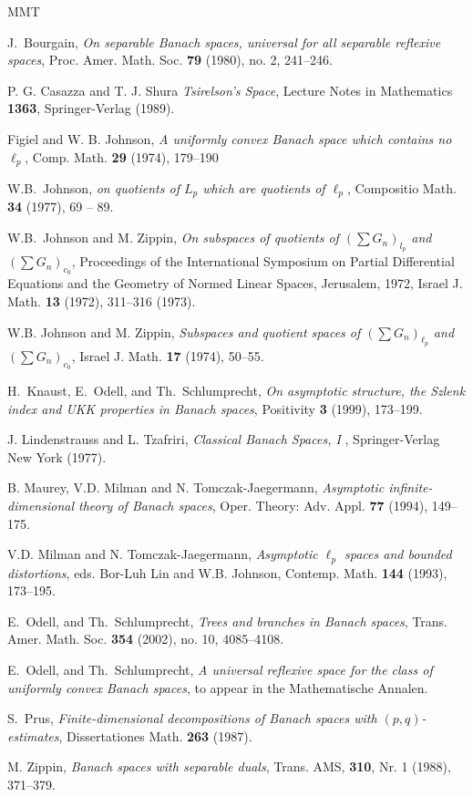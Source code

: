 \documentclass[11pt,leqno]{amsart}
\theoremstyle{definition}
\begin{document}
\begin{thebibliography}{MMT}
  
  
  
  
  J.~Bourgain,   {\em On separable Banach spaces, universal for
  all separable reflexive spaces}, Proc. Amer. Math. Soc. {\bf 79}  (1980),
  no. 2, 241--246.
  
 P. G. Casazza and T. J. Shura
  {\em Tsirelson's Space}, Lecture Notes in Mathematics {\bf 1363},
  Springer-Verlag (1989).
  
 Figiel and W. B. Johnson,
  {\em A uniformly convex Banach space which contains no $\ell_p$},
  Comp. Math. {\bf 29 } (1974), 179--190
  
  
 W.B.~Johnson, {\em on quotients of $L_p$ which are
  quotients of $\ell_p$}, Compositio Math. {\bf 34 } (1977), 69 --
  89.

 W.B.~Johnson and M. Zippin,
  {\em On subspaces of quotients of $(\sum G_n)_{l_p}$ and $(\sum G_n)_{c_0}$},
  Proceedings of the International Symposium on Partial Differential Equations
  and the Geometry of Normed Linear Spaces, Jerusalem, 1972,
  Israel J. Math. {\bf13} (1972), 311--316 (1973).
  
  
  W.B. Johnson and M. Zippin,
  {\em Subspaces and quotient spaces of $(\sum G_n)_{\ell_p}$ and
    $(\sum G_n)_{c_0}$},
  Israel J. Math. {\bf 17} (1974), 50--55.
  
  H.~Knaust, E.~Odell, and Th.~Schlumprecht,
  {\em On asymptotic structure, the Szlenk index and UKK properties in
    Banach spaces},
  Positivity {\bf3} (1999), 173--199.
  
  J. Lindenstrauss and L. Tzafriri,
  {\em Classical Banach Spaces, I }, Springer-Verlag New York (1977).
  
  B. Maurey, V.D. Milman and N. Tomczak-Jaegermann,
  {\em Asymptotic infinite-dimensional theory of Banach spaces},
  Oper. Theory: Adv. Appl. {\bf 77} (1994), 149--175.
  
  V.D. Milman and N. Tomczak-Jaegermann,
  {\em Asymptotic $\ell_p$ spaces and bounded distortions},
  eds. Bor-Luh Lin and W.B. Johnson,
  Contemp. Math. {\bf 144} (1993), 173--195.
  
  E.~Odell, and Th.~Schlumprecht, {\em Trees and branches in Banach spaces},
  Trans. Amer. Math. Soc.  {\bf 354 } (2002),  no. 10, 4085--4108.
  
  E.~Odell, and Th.~Schlumprecht,  {\em A universal reflexive space
    for the class of uniformly convex Banach spaces},  to appear in
  the Mathematische Annalen.

S.~Prus, {\em Finite-dimensional decompositions of Banach spaces
  with $(p,q)$-estimates},  Dissertationes Math. {\bf 263}  (1987).
  
 M. Zippin,
  {\em Banach spaces with separable duals},
  Trans. AMS, {\bf 310}, Nr. 1 (1988), 371--379.
  
\end{thebibliography}
\end{document}
